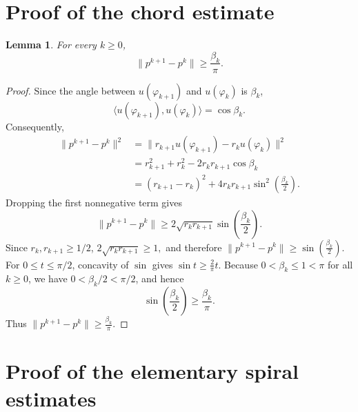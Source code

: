 \documentclass[11pt]{article}
\numberwithin{equation}{section}
\newtheorem{lemma}[theorem]{Lemma}
\begin{document}
\section{Proof of the chord estimate}\label{app:chord}
\begin{lemma}
\label{lem:chord-lower-bound}
For every \(k\ge 0\),
\[
\|p^{k+1}-p^k\|
\ge \frac{\beta_k}{\pi}.
\]
\end{lemma}
\begin{proof}
Since the angle between $u(\varphi_{k+1})$ and $u(\varphi_k)$ is $\beta_k$,
\[
\langle u(\varphi_{k+1}),u(\varphi_k)\rangle=\cos\beta_k.
\]
Consequently,
\begin{align*}
\|p^{k+1}-p^k\|^2
&=
\|r_{k+1}u(\varphi_{k+1})-r_ku(\varphi_k)\|^2\\
&=
r_{k+1}^2+r_k^2-2r_kr_{k+1}\cos\beta_k\\
&=
(r_{k+1}-r_k)^2
+4r_kr_{k+1}\sin^2\!\left(\frac{\beta_k}{2}\right).
\end{align*}
Dropping the first nonnegative term gives
\[
\|p^{k+1}-p^k\|
\ge
2\sqrt{r_kr_{k+1}}
\sin\!\left(\frac{\beta_k}{2}\right).
\]
Since $r_k,r_{k+1}\ge 1/2$,
$
2\sqrt{r_kr_{k+1}}\ge1,
$
and therefore
$
\|p^{k+1}-p^k\|
\ge
\sin\!\left(\frac{\beta_k}{2}\right).
$
For $0\le t\le\pi/2$, concavity of $\sin$ gives
$
\sin t\ge \frac{2}{\pi}t.
$
Because $0<\beta_k\le1<\pi$ for all $k\ge0$, we have
$0<\beta_k/2<\pi/2$, and hence
\[
\sin\!\left(\frac{\beta_k}{2}\right)
\ge
\frac{\beta_k}{\pi}.
\]
Thus
$
\|p^{k+1}-p^k\|\ge\frac{\beta_k}{\pi}.
$
\end{proof}

\section{Proof of the elementary spiral estimates}\label{app:spiral-estimates}
\end{document}
